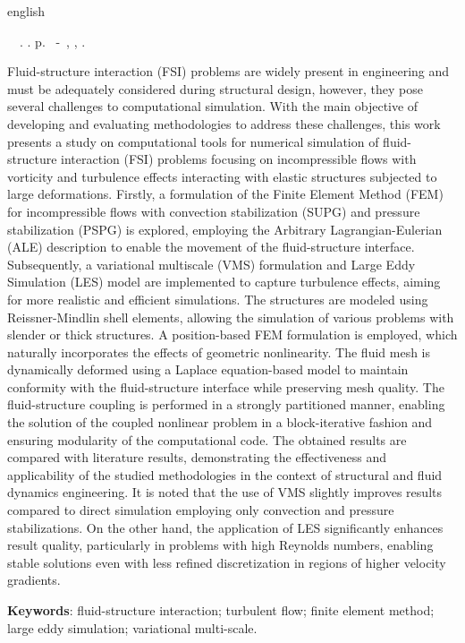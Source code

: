 \begin{resumo}[Abstract]
	\begin{otherlanguage*}{english}
		\begin{flushleft}
			\setlength{\absparsep}{0pt} %
			\SingleSpacing  		\imprimirautorabr~~\textbf{\imprimirtitleabstract}.	\imprimirdata.  \pageref{LastPage} p.
			\imprimirtipotrabalhoabs~-~\imprimirinstituicao, \imprimirlocal, 	\imprimirdata.
		\end{flushleft}
		\OnehalfSpacing

		Fluid-structure interaction (FSI) problems are widely present in engineering and must be adequately considered during structural design, however, they pose several challenges to computational simulation. With the main objective of developing and evaluating methodologies to address these challenges, this work presents a study on computational tools for numerical simulation of fluid-structure interaction (FSI) problems focusing on incompressible flows with vorticity and turbulence effects interacting with elastic structures subjected to large deformations. Firstly, a formulation of the Finite Element Method (FEM) for incompressible flows with convection stabilization (SUPG) and pressure stabilization (PSPG) is explored, employing the Arbitrary Lagrangian-Eulerian (ALE) description to enable the movement of the fluid-structure interface. Subsequently, a variational multiscale (VMS) formulation and Large Eddy Simulation (LES) model are implemented to capture turbulence effects, aiming for more realistic and efficient simulations. The structures are modeled using Reissner-Mindlin shell elements, allowing the simulation of various problems with slender or thick structures. A position-based FEM formulation is employed, which naturally incorporates the effects of geometric nonlinearity. The fluid mesh is dynamically deformed using a Laplace equation-based model to maintain conformity with the fluid-structure interface while preserving mesh quality. The fluid-structure coupling is performed in a strongly partitioned manner, enabling the solution of the coupled nonlinear problem in a block-iterative fashion and ensuring modularity of the computational code. The obtained results are compared with literature results, demonstrating the effectiveness and applicability of the studied methodologies in the context of structural and fluid dynamics engineering. It is noted that the use of VMS slightly improves results compared to direct simulation employing only convection and pressure stabilizations. On the other hand, the application of LES significantly enhances result quality, particularly in problems with high Reynolds numbers, enabling stable solutions even with less refined discretization in regions of higher velocity gradients.		\vspace{\onelineskip}

		\noindent
		\textbf{Keywords}: fluid-structure interaction; turbulent flow; finite element method; large eddy simulation; variational multi-scale.
	\end{otherlanguage*}
\end{resumo}
